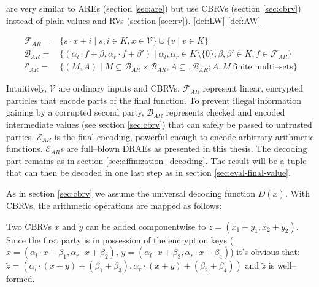 
are very similar to AREs
(section \ref{sec:are}) but use CBRVs (section \ref{sec:cbrv}) instead of plain
values and RVs (section \ref{sec:rv}). \ref{def:LW} \ref{def:AW}

\begin{align}
  \mathcal{F}_{AR} = & \{ s \cdot x + i \mid s, i \in K, x \in \mathcal{V} \}
  \cup \{ v \mid v \in K \} \\
%
  \mathcal{B}_{AR} = & \{ (\alpha_l \cdot f + \beta, \alpha_r \cdot f + \beta' )
  \mid \alpha_l, \alpha_r \in K \setminus \{0\}; \beta, \beta' \in K; f \in
  \mathcal{F}_{AR} \} \\
%
  \label{rel:drae}
  \mathcal{E}_{AR} = & \{ (M, A) \mid
    M \subseteq \mathcal{B}_{AR} \times \mathcal{B}_{AR},
    A \subseteq, \mathcal{B}_{AR};
    A, M~\text{finite multi--sets} \}
%
\end{align}

\noindent Intuitively, $\mathcal{V}$ are ordinary inputs and CBRVs,
$\mathcal{F}_{AR}$ represent linear, encrypted particles that encode parts of
the final function. To prevent illegal information gaining by a corrupted second
party, $\mathcal{B}_{AR}$ represents checked and encoded intermediate values
(see section \ref{sec:cbrv}) that can safely be passed to untrusted parties.
$\mathcal{E}_{AR}$ is the final encoding, powerful enough to encode arbitrary
arithmetic functions. $\mathcal{E}_{AR}$s are full--blown DRAEs as presented in
this thesis. The decoding part remains as in section
\ref{sec:affinization_decoding}. The result will be a tuple that can then be
decoded in one last step as in section \ref{sec:eval-final-value}.


\label{sec:encode-drae}

As in section \ref{sec:cbrv} we assume the universal decoding function
$D(\widetilde{x})$. With CBRVs, the arithmetic operations are mapped as follows:



Two CBRVs $\widetilde{x}$ and $\widetilde{y}$ can be added componentwise to
$\widetilde{z} = \left(\widetilde{x_1} + \widetilde{y_1}, \widetilde{x_2} +
\widetilde{y_2}\right)$. Since the first party is in
possession of the encryption keys ($\widetilde{x} = \left(\alpha_l \cdot x +
\beta_1, \alpha_r \cdot x + \beta_2\right)$, $\widetilde{y} = \left(\alpha_l
\cdot x + \beta_3, \alpha_r \cdot x + \beta_4\right)$) it's obvious that:
$\widetilde{z} = \left(\alpha_l \cdot (x+y) + (\beta_1 + \beta_3), \alpha_r
\cdot (x+y) + (\beta_2 + \beta_4)\right)$ and $\widetilde{z}$ is well--formed.

